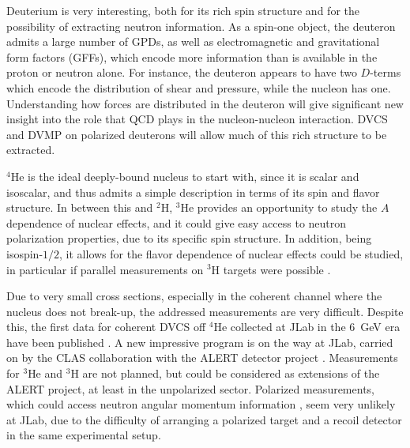 
Deuterium is very interesting, both for its rich spin structure
and for the possibility of extracting neutron information.
As a spin-one object, the deuteron admits a large number of GPDs,
as well as electromagnetic and gravitational form factors (GFFs),
which encode more information than is available in the proton or neutron alone.
For instance, the deuteron appears to have two $D$-terms which encode
the distribution of shear and pressure, while the nucleon has one.
Understanding how forces are distributed in the deuteron
will give significant new insight into the role that QCD plays
in the nucleon-nucleon interaction. DVCS and DVMP on polarized deuterons
will allow much of this rich structure to be extracted.

$^4$He is the ideal deeply-bound nucleus to start with,
since it is scalar and isoscalar, and thus admits a simple
description in terms of its spin and flavor structure.
In between this and $^2$H, $^3$He provides an opportunity
to study the $A$ dependence of nuclear effects, and
it could give easy access to neutron polarization properties,
due to its specific spin structure.
In addition, being isospin-$1/2$, it allows for the
flavor dependence of nuclear effects could be studied, 
in particular if parallel measurements 
on $^3$H targets were possible \cite{Scopetta:2009sn}.

Due to very small cross sections,
especially in the coherent channel where the nucleus does not break-up,
the addressed measurements are very difficult.
Despite this, the first data for coherent DVCS off $^4$He
collected at JLab in the 6~GeV era
have been published \cite{Hattawy:2017woc}.
A new impressive program is on the way at JLab,
carried on by the CLAS collaboration with the ALERT detector project 
\cite{Armstrong:2017wfw,Armstrong:2017zcm,Armstrong:2017zqr}.
Measurements for $^3$He and $^3$H
are not planned, but could be considered
as extensions of the ALERT project, at least in the unpolarized 
sector. Polarized measurements, which could
access neutron angular momentum information \cite{Rinaldi:2012pj,
Rinaldi:2012ft,Rinaldi:2014bba}, seem
very unlikely at JLab, due to the difficulty of arranging
a polarized target and a recoil detector in the same experimental setup. 

